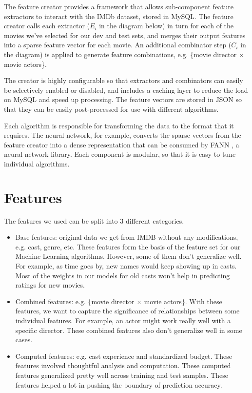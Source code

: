 \documentclass[journal]{IEEEtran}
\begin{document}
\par The feature creator provides a framework that allows sub-component
feature extractors to interact with the IMDb dataset, stored in MySQL.  The feature
creator calls each extractor ($E_i$ in the diagram below) in turn for each of the movies we've selected for our
dev and test sets, and merges their output features into a sparse feature vector for
each movie.  An additional combinator step ($C_i$ in the diagram) is applied to generate feature
combinations, e.g. \{movie director $\times$ movie actors\}.
\\
\par The creator is highly configurable so that extractors and combinators can easily be selectively enabled or disabled,
and includes a caching layer to reduce the load on MySQL and speed up processing.
The feature vectors are stored in JSON so that they can be easily
post-processed for use with different algorithms.
\\
\par Each algorithm is responsible for transforming the data to the format that it requires.
The neural network, for example, converts the sparse vectors from the feature creator
into a dense representation that can be consumed by FANN \cite{fann}, a neural network library.  Each
component is modular, so that it is easy to tune individual algorithms.


\section{Features}
The features we used can be split into 3 different categories.
\\
\begin{itemize}
\item Base features: original data we get from IMDB without any modifications, e.g. cast, genre, etc. These features form the basis of the feature set for our Machine Learning algorithms. However, some of them don't generalize well. For example, as time goes by, new names would keep showing up in casts. Most of the weights in our models for old casts won't help in predicting ratings for new movies.\\

\item Combined features: e.g. \{movie director $\times$ movie actors\}. With these features, we want to capture the significance of relationships between some individual features. For example, an actor might work really well with a specific director. These combined features also don't generalize well in some cases.\\

\item Computed features: e.g. cast experience and standardized budget. These features involved thoughtful analysis and computation. These computed features generalized pretty well across training and test samples. These features helped a lot in pushing the boundary of prediction accuracy.
\end{itemize}
\end{document}
